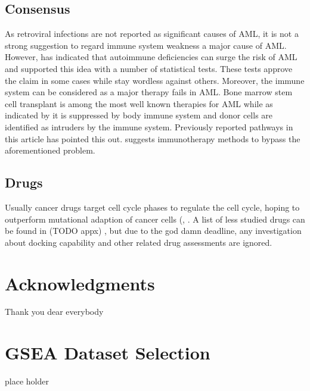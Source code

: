 \documentclass[3p,authoryear,preprint,12pt]{elsarticle}
\begin{document}
\subsection{Consensus}
As retroviral infections are not reported as significant causes of AML, it is not a strong suggestion to regard immune system weakness a major cause of AML. However, \cite{Ramadan2012} has indicated that autoimmune deficiencies can surge the risk of AML and supported this idea with a number of statistical tests. These tests approve the claim in some cases while stay wordless against others. Moreover, the immune system can be considered as a major therapy fails in AML. Bone marrow stem cell transplant is among the most well known therapies for AML while as indicated by \cite{Horowitz555} it is suppressed by body immune system and donor cells are identified as intruders by the immune system. Previously reported pathways in this article has pointed this out. \cite{Lamble2018} suggests immunotherapy methods to bypass the aforementioned problem.

\subsection{Drugs}
Usually cancer drugs target cell cycle phases to regulate the cell cycle, hoping to outperform mutational adaption of cancer cells (\cite{Shapiro1999}, \cite{Bai2017}. A list of less studied drugs can be found in (TODO appx)
, but due to the god damn deadline, any investigation about docking capability and other related drug assessments are ignored.

\section*{Acknowledgments} Thank you dear everybody
\appendix

\section{GSEA Dataset Selection}\label{appendix-title-1f696b9ef905}
    place holder
\end{document}
